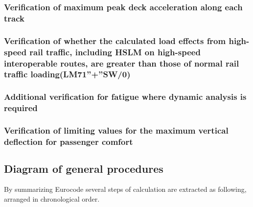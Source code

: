 \subsubsection{Verification of maximum peak deck acceleration along each track}
\subsubsection{Verification of whether the calculated load effects from high-speed rail traffic, including HSLM on high-speed interoperable routes, are greater than those of normal rail traffic loading(LM71''+''SW/0)}
\subsubsection{Additional verification for fatigue where dynamic analysis is required}
\subsubsection{Verification of limiting values for the maximum vertical deflection for passenger comfort}

\subsection{Diagram of general procedures}
By summarizing Eurocode several steps of calculation are extracted as following, arranged in chronological order.

